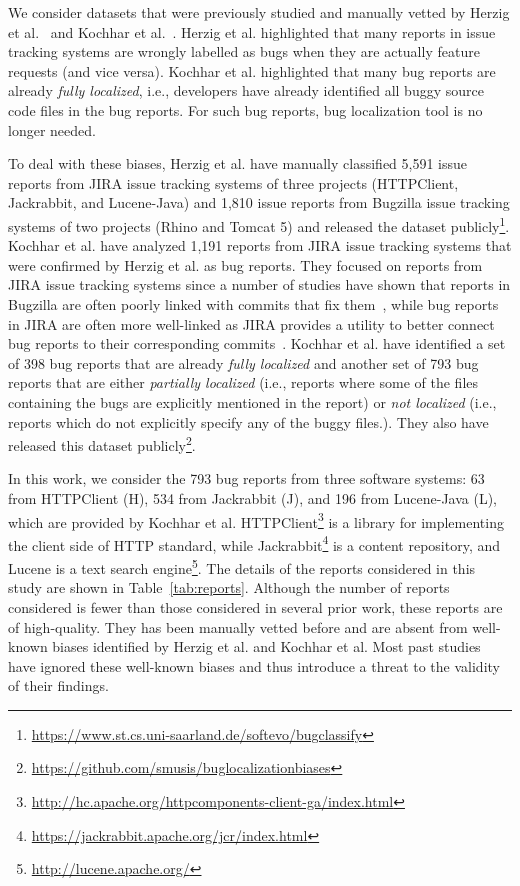 We consider datasets that were previously studied and manually vetted by Herzig et al.~\cite{HerzigJZ13} and Kochhar et al.~\cite{KochharTL14}. Herzig et al. highlighted that many reports in issue tracking systems are wrongly labelled as bugs when they are actually feature requests (and vice versa). Kochhar et al. highlighted that many bug reports are already {\em fully localized}, i.e., developers have already identified all buggy source code files in the bug reports. For such bug reports, bug localization tool is no longer needed.

To deal with these biases, Herzig et al. have manually classified 5,591 issue reports from JIRA issue tracking systems of three projects (HTTPClient, Jackrabbit, and Lucene-Java) and 1,810 issue reports from Bugzilla issue tracking systems of two projects (Rhino and Tomcat 5) and released the dataset publicly\footnote{\url{https://www.st.cs.uni-saarland.de/softevo/bugclassify}}. Kochhar et al. have analyzed 1,191 reports from JIRA issue tracking systems that were confirmed by Herzig et al. as bug reports. They focused on reports from JIRA issue tracking systems since a number of studies have shown that reports in Bugzilla are often poorly linked with commits that fix them~\cite{BachmannBRDB10,BirdBADBFD09}, while bug reports in JIRA are often more well-linked as JIRA provides a utility to better connect bug reports to their corresponding commits~\cite{BissyandeTWLJR13}. Kochhar et al. have identified a set of 398 bug reports that are already {\em fully localized} and another set of 793 bug reports that are either {\em partially localized} (i.e., reports where some of the files containing the bugs are explicitly mentioned in the report) or {\em not localized} (i.e., reports which do not explicitly specify any of the buggy files.). They also have released this dataset publicly\footnote{\url{https://github.com/smusis/buglocalizationbiases}}.

In this work, we consider the 793 bug reports from three software systems: 63 from HTTPClient (H), 534 from Jackrabbit (J), and 196 from Lucene-Java (L), which are provided by Kochhar et al. HTTPClient\footnote{\url{http://hc.apache.org/httpcomponents-client-ga/index.html}} is a library for implementing the client side of HTTP standard, while Jackrabbit\footnote{\url{https://jackrabbit.apache.org/jcr/index.html}} is a content repository, and Lucene is a text search engine\footnote{\url{ http://lucene.apache.org/}}. The details of the reports considered in this study are shown in Table~\ref{tab:reports}. Although the number of reports considered is fewer than those considered in several prior work, these reports are of high-quality. They has been manually vetted before and are absent from well-known biases identified by Herzig et al. and Kochhar et al. Most past studies have ignored these well-known biases and thus introduce a threat to the validity of their findings.


